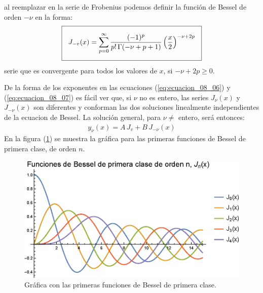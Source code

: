 al reemplazar en la serie de Frobenius podemos definir la función de Bessel de orden $-\nu$ en la forma:
\begin{align}
\setlength{\fboxsep}{3\fboxsep}\boxed{
J_{-v} (x) = \sum_{p=0}^{\infty} \dfrac{(-1)^{p}}{p! \, \Gamma (-\nu + p + 1)} \left( \dfrac{x}{2} \right)^{-\nu+2p}}
\label{eq:ecuacion_08_07}
\end{align}
serie que es convergente para todos los valores de $x$, si $-\nu + 2p \geq 0$.
\par
De la forma de los exponentes en las ecuaciones (\ref{eq:ecuacion_08_06}) y (\ref{eq:ecuacion_08_07}) es fácil ver que, si $\nu$ no es entero, las series $J_{\nu}(x)$ y $J_{-\nu}(x)$ son diferentes y conforman las dos soluciones linealmente independientes de la ecuacion de Bessel. La solución general, para $\nu \neq$ entero, será entonces:
\begin{align*}
y_{\nu}(x) = A \, J_{v} + B \, J_{-\nu} (x)
\end{align*}
En la figura (\ref{fig:figura_plot_Bessel}) se muestra la gráfica para las primeras funciones de Bessel de primera clase, de orden $n$.
\begin{figure}[H]
    \centering
    \includegraphics[scale=1]{Imagenes/Plot_Bessel_01_Bessel.eps}
    \caption{Gráfica con las primeras funciones de Bessel de primera clase.}
    \label{fig:figura_plot_Bessel}
\end{figure}

